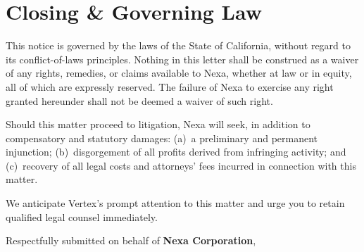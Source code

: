 
\section{Closing \& Governing Law}

This notice is governed by the laws of the State of California, without regard
to its conflict-of-laws principles. Nothing in this letter shall be construed
as a waiver of any rights, remedies, or claims available to Nexa, whether at
law or in equity, all of which are expressly reserved. The failure of Nexa to
exercise any right granted hereunder shall not be deemed a waiver of such right.

Should this matter proceed to litigation, Nexa will seek, in addition to
compensatory and statutory damages: (a)~a preliminary and permanent injunction;
(b)~disgorgement of all profits derived from infringing activity; and
(c)~recovery of all legal costs and attorneys' fees incurred in connection
with this matter.

\vspace{6pt}

\noindent
We anticipate Vertex's prompt attention to this matter and urge you to retain
qualified legal counsel immediately.

\vspace{24pt}

\noindent
Respectfully submitted on behalf of \textbf{Nexa Corporation},

\vspace{12pt}


\par

\vspace{18pt}


\vspace{22pt}

